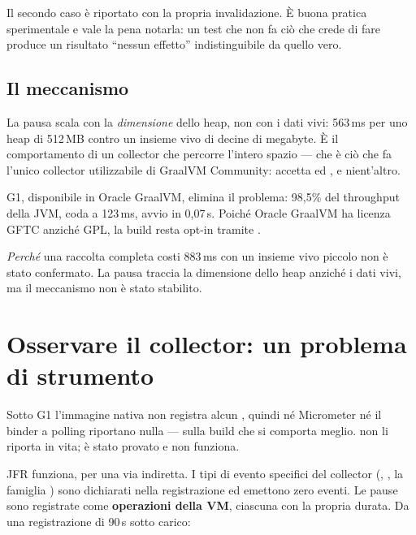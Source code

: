 Il secondo caso \`e riportato con la propria invalidazione. \`E buona pratica
sperimentale e vale la pena notarla: un test che non fa ci\`o che crede di fare
produce un risultato ``nessun effetto'' indistinguibile da quello vero.

\subsection{Il meccanismo}

La pausa scala con la \emph{dimensione} dello heap, non con i dati vivi:
563\,ms per uno heap di 512\,MB contro un insieme vivo di decine di megabyte. \`E
il comportamento di un collector che percorre l'intero spazio --- che \`e ci\`o
che fa l'unico collector utilizzabile di GraalVM Community:  accetta
 ed , e nient'altro.

G1, disponibile in Oracle GraalVM, elimina il problema: 98{,}5\% del throughput
della JVM, coda a 123\,ms, avvio in 0{,}07\,s. Poich\'e Oracle GraalVM ha licenza
GFTC anzich\'e GPL, la build resta opt-in tramite .

\begin{damisurare}
\emph{Perch\'e} una raccolta completa costi 883\,ms con un insieme vivo piccolo
non \`e stato confermato. La pausa traccia la dimensione dello heap anzich\'e i
dati vivi, ma il meccanismo non \`e stato stabilito.
\end{damisurare}

\section{Osservare il collector: un problema di strumento}

Sotto G1 l'immagine nativa non registra alcun ,
quindi n\'e Micrometer n\'e il binder a polling riportano nulla --- sulla build
che si comporta meglio.  non li
riporta in vita; \`e stato provato e non funziona.

JFR funziona, per una via indiretta. I tipi di evento specifici del collector
(, , la famiglia
) sono dichiarati nella registrazione ed emettono zero eventi. Le
pause sono registrate come \textbf{operazioni della VM}, ciascuna con la propria
durata. Da una registrazione di 90\,s sotto carico:


